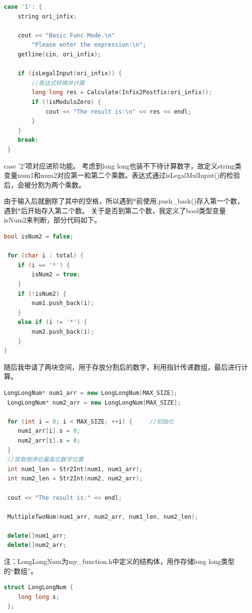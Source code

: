 \documentclass[a4paper, 11pt, UTF8]{ctexart}
\begin{document}
\begin{lstlisting}[language=C++, basicstyle=\ttfamily]
 case '1': {
    string ori_infix;

    cout << "Basic Func Mode.\n"
        "Please enter the expression:\n";
    getline(cin, ori_infix);

    if (isLegalInput(ori_infix)) {
        //表达式转换并计算
        long long res = Calculate(Infix2Postfix(ori_infix));
        if (!isModuloZero) {
            cout << "The result is:\n" << res << endl;
        }
    }
    break;
 }   
\end{lstlisting}

case '2'项对应进阶功能。
考虑到long long也装不下待计算数字，故定义string类变量num1和num2对应第一和第二个乘数。表达式通过isLegalMulInput()的检验后，会被分割为两个乘数。

由于输入后就删除了其中的空格，所以遇到*前使用.push\_back()存入第一个数，遇到*后开始存入第二个数。
关于是否到第二个数，我定义了bool类型变量isNum2来判断，部分代码如下。

\begin{lstlisting}[language=C++, basicstyle=\ttfamily]
 bool isNum2 = false;

 for (char i : total) {
    if (i == '*') {
        isNum2 = true;
    }
    if (!isNum2) {
        num1.push_back(i);
    }
    else if (i != '*') {
        num2.push_back(i);
    }
}
\end{lstlisting}

随后我申请了两块空间，用于存放分割后的数字，利用指针传递数组，最后进行计算。

\begin{lstlisting}[language=C++, basicstyle=\ttfamily]
 LongLongNum* num1_arr = new LongLongNum[MAX_SIZE];
 LongLongNum* num2_arr = new LongLongNum[MAX_SIZE];

 for (int i = 0; i < MAX_SIZE; ++i) {     //初始化
    num1_arr[i].s = 0;
    num2_arr[i].s = 0;
 }
 //获取倒序后最高位数字位置
 int num1_len = Str2Int(num1, num1_arr); 
 int num2_len = Str2Int(num2, num2_arr);

 cout << "The result is:" << endl;

 MultipleTwoNum(num1_arr, num2_arr, num1_len, num2_len);

 delete[]num1_arr;
 delete[]num2_arr;
\end{lstlisting}

注：LongLongNum为my\_function.h中定义的结构体，用作存储long long类型的“数组”。

\begin{lstlisting}[language=C++, basicstyle=\ttfamily]
 struct LongLongNum { 
    long long s;
 };
\end{lstlisting}
\end{document}
